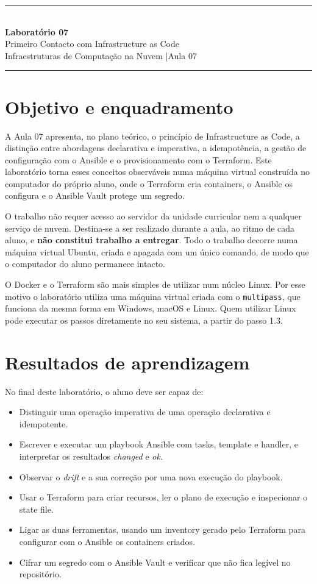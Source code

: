 \documentclass[11pt,a4paper]{article}
\newcommand{\cmd}[1]{\texttt{#1}}
\newcommand{\labtitle}[3]{%
  \thispagestyle{empty}
  \begin{center}
  {\color{NudeTaupe}\rule{\textwidth}{0.5pt}}\\[0.6cm]
  {\LARGE\bfseries\color{TextEspresso} Laboratório #1}\\[0.4cm]
  {\large\color{TextEspresso} #2}\\[0.35cm]
  {\normalsize\color{NudeTaupe} Infraestruturas de Computação na Nuvem \quad|\quad #3}\\[0.5cm]
  {\color{NudeTaupe}\rule{\textwidth}{0.5pt}}
  \end{center}
  \vspace{0.5cm}
}
\begin{document}
\labtitle{07}{Primeiro Contacto com Infrastructure as Code}{Aula 07}

\section*{Objetivo e enquadramento}

A Aula 07 apresenta, no plano teórico, o princípio de Infrastructure as Code, a distinção entre abordagens declarativa e imperativa, a idempotência, a gestão de configuração com o Ansible e o provisionamento com o Terraform. Este laboratório torna esses conceitos observáveis numa máquina virtual construída no computador do próprio aluno, onde o Terraform cria containers, o Ansible os configura e o Ansible Vault protege um segredo.

O trabalho não requer acesso ao servidor da unidade curricular nem a qualquer serviço de nuvem. Destina-se a ser realizado durante a aula, ao ritmo de cada aluno, e \textbf{não constitui trabalho a entregar}. Todo o trabalho decorre numa máquina virtual Ubuntu, criada e apagada com um único comando, de modo que o computador do aluno permanece intacto.

\begin{nota}
O Docker e o Terraform são mais simples de utilizar num núcleo Linux. Por esse motivo o laboratório utiliza uma máquina virtual criada com o \cmd{multipass}, que funciona da mesma forma em Windows, macOS e Linux. Quem utilizar Linux pode executar os passos diretamente no seu sistema, a partir do passo 1.3.
\end{nota}

\section*{Resultados de aprendizagem}

No final deste laboratório, o aluno deve ser capaz de:

\begin{itemize}
  \item Distinguir uma operação imperativa de uma operação declarativa e idempotente.
  \item Escrever e executar um playbook Ansible com tasks, template e handler, e interpretar os resultados \emph{changed} e \emph{ok}.
  \item Observar o \emph{drift} e a sua correção por uma nova execução do playbook.
  \item Usar o Terraform para criar recursos, ler o plano de execução e inspecionar o state file.
  \item Ligar as duas ferramentas, usando um inventory gerado pelo Terraform para configurar com o Ansible os containers criados.
  \item Cifrar um segredo com o Ansible Vault e verificar que não fica legível no repositório.
\end{itemize}
\end{document}

